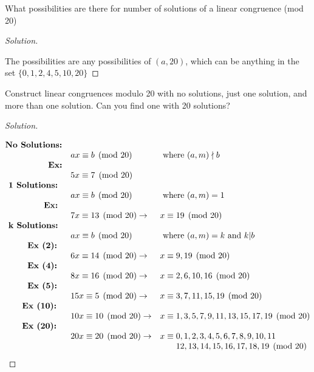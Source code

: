 \documentclass[11pt]{article}
\newcommand{\ndiv}{\nmid}
\newenvironment{problem}[2][Problem]{\begin{trivlist}
\item[\hskip \labelsep {\bfseries #1}\hskip \labelsep {\bfseries #2.}]}{\end{trivlist}}
\newenvironment{solution}
  {\renewcommand\qedsymbol{$~$}\begin{proof}[Solution]$ $\par\nobreak\ignorespaces}
  {\end{proof}}
\begin{document}
\begin{problem}{5}
What possibilities are there for number of solutions of a linear congruence (mod 20)
\end{problem}

\begin{solution}
  The possibilities are any possibilities of $(a,20)$, which can be anything in the set $\{0,1,2,4,5,10,20\}$
\end{solution}


\begin{problem}{6}
Construct linear congruences modulo 20 with no solutions, just one solution, and more than one solution. Can you find one with 20 solutions?
\end{problem}

\begin{solution}
  \[
    \begin{matrix*}[l]
      \text{\textbf{No Solutions:}} &                  \\
      & ax \equiv b \pmod{20} &\text{ where } (a,m)\ndiv b \\
      \text{\textbf{\phantom{No Solutii}Ex:}} &                  \\
      & 5x \equiv 7 \pmod{20} \\
      \text{\textbf{  1 Solutions:}} &                  \\
      & ax \equiv b \pmod{20} &\text{ where } (a,m)=1 \\
      \text{\textbf{\phantom{  1 Solutii}Ex:}} &                  \\
      & 7x \equiv 13 \pmod{20} \rightarrow & x\equiv 19 \pmod{20} \\
      \text{\textbf{  k Solutions:}} &                  \\
      & ax \equiv b \pmod{20} &\text{ where } (a,m)=k \text{ and } k|b \\
      \text{\textbf{\phantom{  k Sii}Ex (2):}} &                  \\
      & 6x \equiv 14 \pmod{20} \rightarrow & x\equiv 9, 19 \pmod{20} \\
      \text{\textbf{\phantom{  k Sii}Ex (4):}} &                  \\
      & 8x \equiv 16 \pmod{20} \rightarrow&  x\equiv 2, 6, 10, 16 \pmod{20} \\
      \text{\textbf{\phantom{  k Sii}Ex (5):}} &                  \\
      & 15x \equiv 5 \pmod{20} \rightarrow & x\equiv 3, 7, 11, 15, 19 \pmod{20} \\
      \text{\textbf{\phantom{  k S}Ex (10):}} &                  \\
      & 10x \equiv 10 \pmod{20} \rightarrow & x\equiv 1, 3, 5, 7,9,11,13,15,17,19\pmod{20} \\
      \text{\textbf{\phantom{  k S}Ex (20):}} &                  \\
      & 20x \equiv 20 \pmod{20} \rightarrow & x\equiv 0,1,2,3,4,5,6,7,8,9,10,11\\
      && \phantom{x\equiv' } 12,13,14,15,16,17,18,19 \pmod{20} \\

    \end{matrix*}
  \]
\end{solution}
\end{document}
